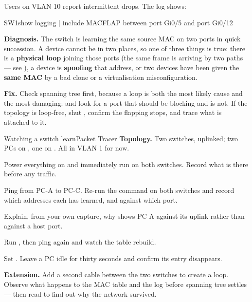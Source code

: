 \begin{breakfix}
Users on VLAN 10 report intermittent drops. The log shows:

\begin{verify}{SW1}{show logging | include MACFLAP}
  between port Gi0/5 and port Gi0/12
\end{verify}

\textbf{Diagnosis.} The switch is learning the same source MAC on two ports in
quick succession. A device cannot be in two places, so one of three things is
true: there is a \textbf{physical loop} joining those ports (the same frame is
arriving by two paths --- see ), a device is \textbf{spoofing} that
address, or two devices have been given the \textbf{same MAC} by a bad clone or
a virtualisation misconfiguration.

\textbf{Fix.} Check spanning tree first, because a loop is both the most likely
cause and the most damaging:  and look for a port
that should be blocking and is not. If the topology is loop-free, shut
, confirm the flapping stops, and trace what is attached to it.
\end{breakfix}

\begin{lab}{Watching a switch learn}{Packet Tracer}
\textbf{Topology.} Two switches, uplinked; two PCs on , one on
. All in VLAN 1 for now.

\begin{tasks}
  \item Power everything on and immediately run  on
        both switches. Record what is there before any traffic.
  \item Ping from PC-A to PC-C. Re-run the command on both switches and record
        which addresses each has learned, and against which port.
  \item Explain, from your own capture, why  shows PC-A against its
        uplink rather than against a host port.
  \item Run , then ping again and watch the
        table rebuild.
  \item Set . Leave a PC idle for thirty
        seconds and confirm its entry disappears.
  \item \textbf{Extension.} Add a second cable between the two switches to create
        a loop. Observe what happens to the MAC table and the log before
        spanning tree settles --- then read  to find out why the
        network survived.
\end{tasks}
\end{lab}


